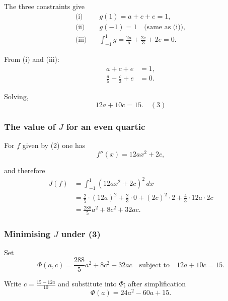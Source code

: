 \documentclass[12pt,a4paper]{article}
\theoremstyle{definition}
\begin{document}
        The three constraints give
        \begin{align}
            \text{(i)} \quad &g(1) = a + c + e = 1, \\
            \text{(ii)} \quad &g(-1) = 1 \quad \text{(same as (i))}, \\
            \text{(iii)} \quad &\int_{-1}^{1} g = \frac{2a}{5} + \frac{2c}{3} + 2e = 0.
        \end{align}

        From (i) and (iii):
        \begin{align}
            a + c + e &= 1, \\
            \frac{a}{5} + \frac{c}{3} + e &= 0.
        \end{align}

        Solving,
        \begin{equation}
            12a + 10c = 15. \quad {(3)}
        \end{equation}

        \subsubsection*{The value of $J$ for an even quartic}

        For $f$ given by (2) one has
        \begin{equation}
            f''(x) = 12ax^2 + 2c,
        \end{equation}

        and therefore
        \begin{align}
            J(f) &= \int_{-1}^{1} (12ax^2 + 2c)^2 \, dx \\
            &= \frac{2}{5} \cdot (12a)^2 + \frac{2}{3} \cdot 0 + (2c)^2 \cdot 2 + \frac{4}{3} \cdot 12a \cdot 2c \\
            &= \frac{288}{5}a^2 + 8c^2 + 32ac. \tag{4}
        \end{align}

        \subsubsection*{Minimising $J$ under (3)}

        Set
        \begin{equation}
            \Phi(a,c) = \frac{288}{5}a^2 + 8c^2 + 32ac \quad \text{subject to} \quad 12a + 10c = 15.
        \end{equation}

        Write $c = \frac{15-12a}{10}$ and substitute into $\Phi$; after simplification
        \begin{equation}
            \Phi(a) = 24a^2 - 60a + 15.
        \end{equation}
\end{document}
